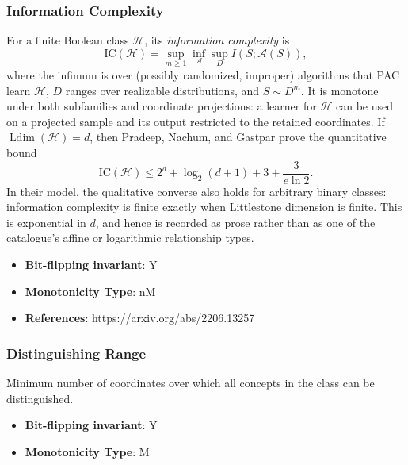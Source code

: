 \subsubsection{Information Complexity}
      
      \begin{definition}\label{def:information_complexity}
      For a finite Boolean class $\mathcal H$, its \emph{information complexity} is
      \[
      \mathrm{IC}(\mathcal H)
      =\sup_{m\geq1}\inf_{\mathcal A}\sup_{D}
      I(S;\mathcal A(S)),
      \]
      where the infimum is over (possibly randomized, improper) algorithms
      that PAC learn $\mathcal H$, $D$ ranges over realizable distributions,
      and $S\sim D^m$.  It is monotone under both subfamilies and coordinate
      projections: a learner for $\mathcal H$ can be used on a projected
      sample and its output restricted to the retained coordinates.  If
      $\operatorname{Ldim}(\mathcal H)=d$, then Pradeep, Nachum, and Gastpar
      prove the quantitative bound
      \[
      \mathrm{IC}(\mathcal H)\leq
      2^d+\log_2(d+1)+3+\frac{3}{e\ln 2}.
      \]
      In their model, the qualitative converse also holds for arbitrary
      binary classes: information complexity is finite exactly when
      Littlestone dimension is finite.
      This is exponential in $d$, and hence is recorded as prose rather than
      as one of the catalogue's affine or logarithmic relationship types.
      \end{definition}
      \begin{itemize}
      \item {\bf Bit-flipping invariant}: Y
      \item {\bf Monotonicity Type}: nM
      \item {\bf References}: https://arxiv.org/abs/2206.13257
\end{itemize}
\subsubsection{Distinguishing Range}
      
      \begin{definition}\label{def:distinguishing_range}
      Minimum number of coordinates over which all concepts in the class can be distinguished.
      \end{definition}
      \begin{itemize}
      \item {\bf Bit-flipping invariant}: Y
      \item {\bf Monotonicity Type}: M
      \end{itemize}
